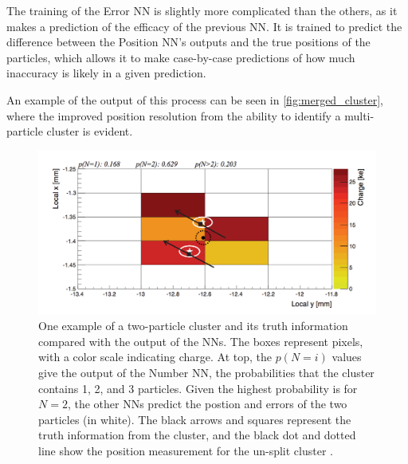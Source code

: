The training of the Error \ac{NN} is slightly more complicated than the others, as it makes a prediction of the efficacy of the previous \ac{NN}. It is trained to predict the difference between the Position \ac{NN}'s outputs and the true positions of the particles, which allows it to make case-by-case predictions of how much inaccuracy is likely in a given prediction.  %


An example of the output of this process can be seen in \autoref{fig:merged_cluster}, where the improved position resolution from the ability to identify a multi-particle cluster is evident. 

\begin{centering}
\begin{figure}[bth]
\myfloatalign
\includegraphics[width=.90\linewidth]{figures/nn/merged_cluster.png}
\caption{One example of a two-particle cluster and its truth information compared with the output of the \acp{NN}. The boxes represent pixels, with a color scale indicating charge. At top, the $p(N=i)$ values give the output of the Number \ac{NN}, the probabilities that the cluster contains 1, 2, and 3 particles. Given the highest probability is for $N=2$, the other \acp{NN} predict the postion and errors of the two particles (in white). The black arrows and squares represent the truth information from the cluster, and the black dot and dotted line show the position measurement for the un-split cluster \cite{PERF-2012-05}.}
\label{fig:merged_cluster}
\end{figure}
\end{centering}


